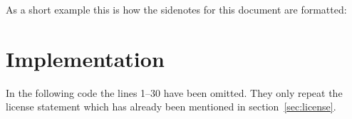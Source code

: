 \documentclass[load-preamble+]{cnltx-doc}
\begin{document}
As a short example this is how the sidenotes for this document are formatted:
\begin{sourcecode}
\end{sourcecode}


\section{Implementation}
In the following code the lines 1--30 have been omitted. They only repeat the
license statement which has already been mentioned in section~\ref{sec:license}.


 
\end{document}
